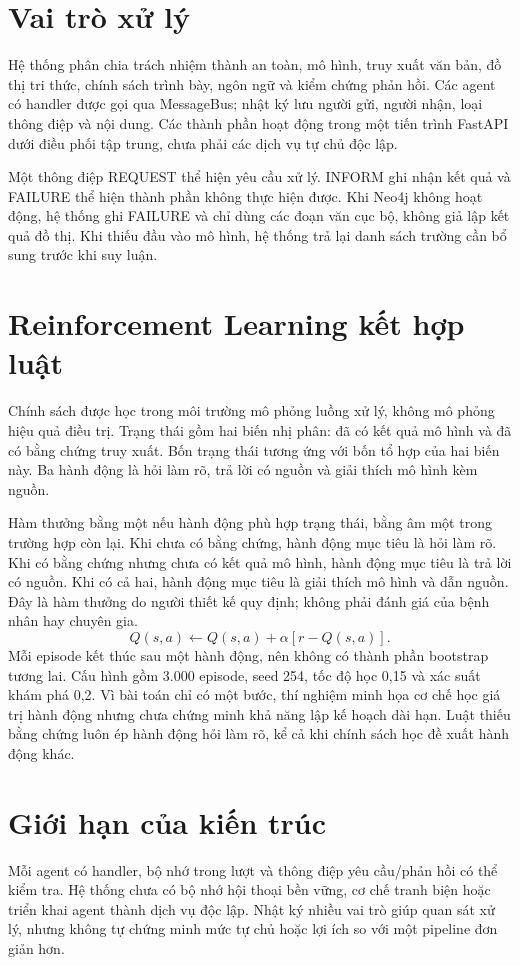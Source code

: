 \section{Vai trò xử lý}
Hệ thống phân chia trách nhiệm thành an toàn, mô hình, truy xuất văn bản, đồ thị tri thức, chính sách trình bày, ngôn ngữ và kiểm chứng phản hồi. Các agent có handler được gọi qua MessageBus; nhật ký lưu người gửi, người nhận, loại thông điệp và nội dung. Các thành phần hoạt động trong một tiến trình FastAPI dưới điều phối tập trung, chưa phải các dịch vụ tự chủ độc lập.

Một thông điệp REQUEST thể hiện yêu cầu xử lý. INFORM ghi nhận kết quả và FAILURE thể hiện thành phần không thực hiện được. Khi Neo4j không hoạt động, hệ thống ghi FAILURE và chỉ dùng các đoạn văn cục bộ, không giả lập kết quả đồ thị. Khi thiếu đầu vào mô hình, hệ thống trả lại danh sách trường cần bổ sung trước khi suy luận.
\section{Reinforcement Learning kết hợp luật}
Chính sách được học trong môi trường mô phỏng luồng xử lý, không mô phỏng hiệu quả điều trị. Trạng thái gồm hai biến nhị phân: đã có kết quả mô hình và đã có bằng chứng truy xuất. Bốn trạng thái tương ứng với bốn tổ hợp của hai biến này. Ba hành động là hỏi làm rõ, trả lời có nguồn và giải thích mô hình kèm nguồn.

Hàm thưởng bằng một nếu hành động phù hợp trạng thái, bằng âm một trong trường hợp còn lại. Khi chưa có bằng chứng, hành động mục tiêu là hỏi làm rõ. Khi có bằng chứng nhưng chưa có kết quả mô hình, hành động mục tiêu là trả lời có nguồn. Khi có cả hai, hành động mục tiêu là giải thích mô hình và dẫn nguồn. Đây là hàm thưởng do người thiết kế quy định; không phải đánh giá của bệnh nhân hay chuyên gia.
\[
Q(s,a)\leftarrow Q(s,a)+\alpha[r-Q(s,a)].
\]
Mỗi episode kết thúc sau một hành động, nên không có thành phần bootstrap tương lai. Cấu hình gồm 3.000 episode, seed 254, tốc độ học 0,15 và xác suất khám phá 0,2. Vì bài toán chỉ có một bước, thí nghiệm minh họa cơ chế học giá trị hành động nhưng chưa chứng minh khả năng lập kế hoạch dài hạn. Luật thiếu bằng chứng luôn ép hành động hỏi làm rõ, kể cả khi chính sách học đề xuất hành động khác.
\section{Giới hạn của kiến trúc}
Mỗi agent có handler, bộ nhớ trong lượt và thông điệp yêu cầu/phản hồi có thể kiểm tra. Hệ thống chưa có bộ nhớ hội thoại bền vững, cơ chế tranh biện hoặc triển khai agent thành dịch vụ độc lập. Nhật ký nhiều vai trò giúp quan sát xử lý, nhưng không tự chứng minh mức tự chủ hoặc lợi ích so với một pipeline đơn giản hơn.
